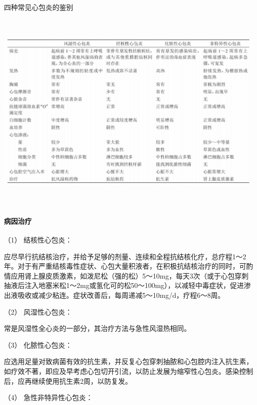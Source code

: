 \begin{table}[htbp]
\centering
\caption{四种常见心包炎的鉴别}
\label{tab104-2}
\includegraphics[width=6.64583in,height=3.90625in]{./images/Image00471.jpg}
\end{table}

\paragraph{病因治疗}

\hypertarget{text00302.htmlux5cux23CHP10-4-3-3-1}{}
（1） 结核性心包炎：

应尽早行抗结核治疗，并给予足够的剂量、连续和全程抗结核化疗，总疗程1～2年。对于有严重结核毒性症状、心包大量积液者，在积极抗结核治疗的同时，可酌情应用肾上腺皮质激素，如泼尼松（强的松）5～10mg，每天3次（或于心包穿刺抽液后注入地塞米松1～2mg或氢化可的松50～100mg），以减轻中毒症状，促进渗出液吸收或减少粘连。症状改善后，每周递减5～10mg/d，疗程6～8周。

\hypertarget{text00302.htmlux5cux23CHP10-4-3-3-2}{}
（2） 风湿性心包炎：

常是风湿性全心炎的一部分，其治疗方法与急性风湿热相同。

\hypertarget{text00302.htmlux5cux23CHP10-4-3-3-3}{}
（3） 化脓性心包炎：

应选用足量对致病菌有效的抗生素，并反复心包穿刺抽脓和心包腔内注入抗生素，如疗效不著，即应及早考虑心包切开引流，以防止发展为缩窄性心包炎。感染控制后，应再继续使用抗生素2周，以防复发。

\hypertarget{text00302.htmlux5cux23CHP10-4-3-3-4}{}
（4） 急性非特异性心包炎：

